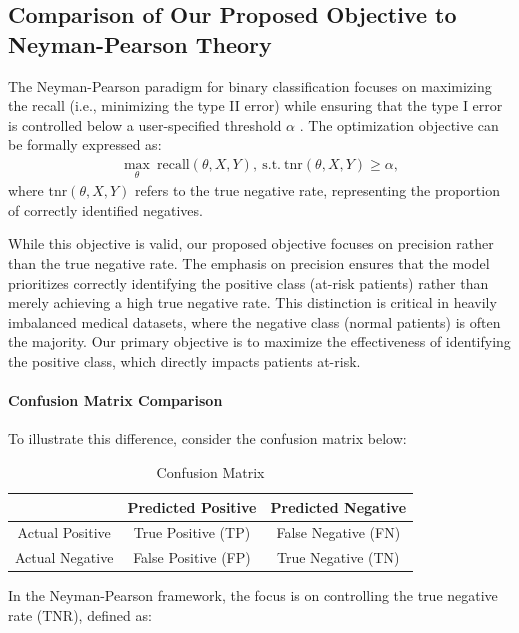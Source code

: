 \subsection{Comparison of Our Proposed Objective to Neyman-Pearson Theory}
The Neyman-Pearson paradigm for binary classification focuses on maximizing the recall (i.e., minimizing the type II error) while ensuring that the type I error is controlled below a user-specified threshold \(\alpha\) \citep{tong2020neyman}. The optimization objective can be formally expressed as:
\begin{align}
\label{eq:neyman_pearson}
\max_{\theta} ~\text{recall}(\theta, X, Y), 
~\text{s.t.}~ \text{tnr}(\theta, X, Y) \geq \alpha,
\end{align}
where \(\text{tnr}(\theta, X, Y)\) refers to the true negative rate, representing the proportion of correctly identified negatives.

While this objective is valid, our proposed objective focuses on precision rather than the true negative rate. The emphasis on precision ensures that the model prioritizes correctly identifying the positive class (at-risk patients) rather than merely achieving a high true negative rate. This distinction is critical in heavily imbalanced medical datasets, where the negative class (normal patients) is often the majority. Our primary objective is to maximize the effectiveness of identifying the positive class, which directly impacts patients at-risk.

\paragraph{\textbf{Confusion Matrix Comparison}}

To illustrate this difference, consider the confusion matrix below:

\begin{table}[h]
\centering
\begin{tabular}{|c|c|c|}
\hline
& Predicted Positive & Predicted Negative \\ \hline
Actual Positive & True Positive (TP) & False Negative (FN) \\ \hline
Actual Negative & False Positive (FP) & True Negative (TN) \\ \hline
\end{tabular}
\caption{Confusion Matrix}
\end{table}

In the Neyman-Pearson framework, the focus is on controlling the true negative rate (TNR), defined as:

